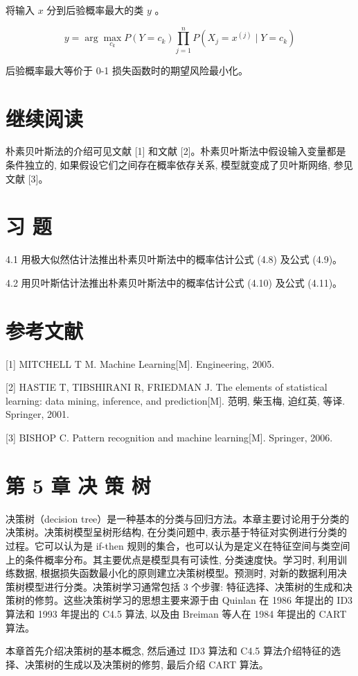 \documentclass[10pt]{article}
\begin{document}
将输入 $x$ 分到后验概率最大的类 $y$ 。

$$
y=\arg \max _{c_{k}} P\left(Y=c_{k}\right) \prod_{j=1}^{n} P\left(X_{j}=x^{(j)} \mid Y=c_{k}\right)
$$

后验概率最大等价于 0-1 损失函数时的期望风险最小化。

\section*{继续阅读}
朴素贝叶斯法的介绍可见文献 [1] 和文献 [2]。朴素贝叶斯法中假设输入变量都是条件独立的, 如果假设它们之间存在概率依存关系, 模型就变成了贝叶斯网络, 参见文献 [3]。

\section*{习 题}
4.1 用极大似然估计法推出朴素贝叶斯法中的概率估计公式 (4.8) 及公式 (4.9)。

4.2 用贝叶斯估计法推出朴素贝叶斯法中的概率估计公式 (4.10) 及公式 (4.11)。

\section*{参考文献}
[1] MITCHELL T M. Machine Learning[M]. Engineering, 2005.

[2] HASTIE T, TIBSHIRANI R, FRIEDMAN J. The elements of statistical learning: data mining, inference, and prediction[M]. 范明, 柴玉梅, 迫红英, 等译. Springer, 2001.

[3] BISHOP C. Pattern recognition and machine learning[M]. Springer, 2006.

\section*{第 5 章 决 策 树}
决策树（decision tree）是一种基本的分类与回归方法。本章主要讨论用于分类的决策树。决策树模型呈树形结构, 在分类问题中, 表示基于特征对实例进行分类的过程。它可以认为是 if-then 规则的集合，也可以认为是定义在特征空间与类空间上的条件概率分布。其主要优点是模型具有可读性, 分类速度快。学习时, 利用训练数据, 根据损失函数最小化的原则建立决策树模型。预测时, 对新的数据利用决策树模型进行分类。决策树学习通常包括 3 个步骤: 特征选择、决策树的生成和决策树的修剪。这些决策树学习的思想主要来源于由 Quinlan 在 1986 年提出的 ID3 算法和 1993 年提出的 C4.5 算法, 以及由 Breiman 等人在 1984 年提出的 CART 算法。

本章首先介绍决策树的基本概念, 然后通过 ID3 算法和 C4.5 算法介绍特征的选择、决策树的生成以及决策树的修剪, 最后介绍 CART 算法。
\end{document}
